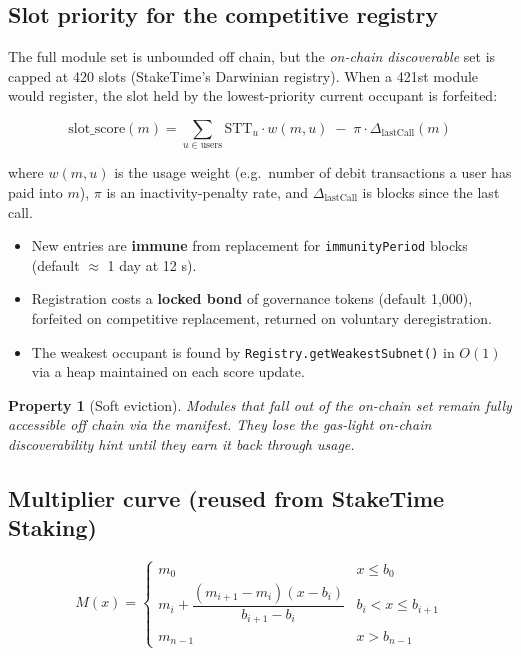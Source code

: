 \documentclass[11pt,a4paper]{article}
\newtheorem{property}{Property}[section]
\begin{document}
\subsection{Slot priority for the competitive registry}

The full module set is unbounded off chain, but the \emph{on-chain discoverable} set is capped at 420 slots (StakeTime's Darwinian registry). When a 421st module would register, the slot held by the lowest-priority current occupant is forfeited:

\begin{equation}
\mathrm{slot\_score}(m) = \sum_{u \in \mathrm{users}} \mathrm{STT}_u \cdot w(m, u) \;-\; \pi \cdot \Delta_{\text{lastCall}}(m)
\label{eq:slot-score}
\end{equation}

where $w(m, u)$ is the usage weight (e.g.\ number of debit transactions a user has paid into $m$), $\pi$ is an inactivity-penalty rate, and $\Delta_{\text{lastCall}}$ is blocks since the last call.

\begin{itemize}
    \item New entries are \textbf{immune} from replacement for \texttt{immunityPeriod} blocks (default $\approx$ 1 day at 12 s).
    \item Registration costs a \textbf{locked bond} of governance tokens (default 1{,}000), forfeited on competitive replacement, returned on voluntary deregistration.
    \item The weakest occupant is found by \texttt{Registry.getWeakestSubnet()} in $O(1)$ via a heap maintained on each score update.
\end{itemize}

\begin{property}[Soft eviction]
Modules that fall out of the on-chain set remain fully accessible off chain via the manifest. They lose the gas-light on-chain discoverability hint until they earn it back through usage.
\end{property}

\subsection{Multiplier curve (reused from StakeTime Staking)}

\begin{equation}
M(x) = \begin{cases}
m_0 & x \leq b_0 \\[4pt]
m_i + \dfrac{(m_{i+1} - m_i)(x - b_i)}{b_{i+1} - b_i} & b_i < x \leq b_{i+1} \\[6pt]
m_{n-1} & x > b_{n-1}
\end{cases}
\label{eq:multiplier-ref}
\end{equation}
\end{document}

